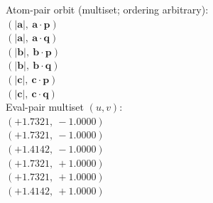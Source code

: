 \documentclass[a4paper,11pt]{article}
\newcommand{\vc}[1]{\ensuremath{\mathbf{#1}}}
\newcommand{\dnfagmiihhiejm}[1]{|\vc{#1}|}
\newcommand{\pdcegfomjfhook}[2]{\mathbf{#1} \cdot \mathbf{#2}}
\begin{document}
\quad Atom-pair orbit (multiset; ordering arbitrary):\\
$(\dnfagmiihhiejm{a},\ \pdcegfomjfhook{a}{p})$\\
$(\dnfagmiihhiejm{a},\ \pdcegfomjfhook{a}{q})$\\
$(\dnfagmiihhiejm{b},\ \pdcegfomjfhook{b}{p})$\\
$(\dnfagmiihhiejm{b},\ \pdcegfomjfhook{b}{q})$\\
$(\dnfagmiihhiejm{c},\ \pdcegfomjfhook{c}{p})$\\
$(\dnfagmiihhiejm{c},\ \pdcegfomjfhook{c}{q})$\\
\quad Eval-pair multiset $(u, v)$:\\
$(+1.7321,\ -1.0000)$\\
$(+1.7321,\ -1.0000)$\\
$(+1.4142,\ -1.0000)$\\
$(+1.7321,\ +1.0000)$\\
$(+1.7321,\ +1.0000)$\\
$(+1.4142,\ +1.0000)$\\
\end{document}
